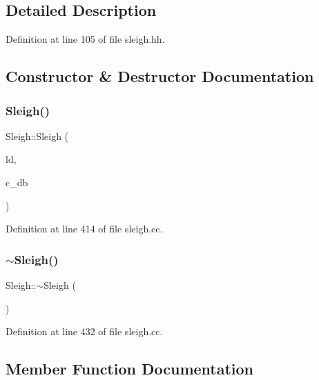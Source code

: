 \subsection{Detailed Description}


Definition at line 105 of file sleigh.\+hh.



\subsection{Constructor \& Destructor Documentation}
\mbox{\label{class_sleigh_a06ab69bb8b47d54d0fce4a222569e21f}} 
\subsubsection{\texorpdfstring{Sleigh()}{Sleigh()}}
{\footnotesize\ttfamily Sleigh\+::\+Sleigh (\begin{DoxyParamCaption}\item[{\mbox{\hyperlink{class_load_image}{Load\+Image}} $\ast$}]{ld,  }\item[{\mbox{\hyperlink{class_context_database}{Context\+Database}} $\ast$}]{c\+\_\+db }\end{DoxyParamCaption})}



Definition at line 414 of file sleigh.\+cc.

\mbox{\label{class_sleigh_a258cd9fc30c87a071a75d6450dea54fc}} 
\subsubsection{\texorpdfstring{$\sim$Sleigh()}{~Sleigh()}}
{\footnotesize\ttfamily Sleigh\+::$\sim$\+Sleigh (\begin{DoxyParamCaption}\item[{void}]{ }\end{DoxyParamCaption})\hspace{0.3cm}{\ttfamily [virtual]}}



Definition at line 432 of file sleigh.\+cc.



\subsection{Member Function Documentation}
\mbox{\label{class_sleigh_a82409ca16da71a07eb338aa71b64882c}} 
